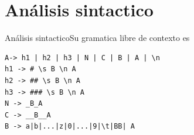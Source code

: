 \documentclass[11pt]{beamer}
\begin{document}
\section{Análisis sintactico}

\begin{frame}[fragile]{Análisis sintactico}{Su gramatica libre de contexto es}
\begin{verbatim}
A-> h1 | h2 | h3 | N | C | B | A | \n
h1 -> # \s B \n A
h2 -> ## \s B \n A
h3 -> ### \s B \n A
N -> _B_A
C -> __B__A
B -> a|b|...|z|0|...|9|\t|BB| A 
\end{verbatim}
\end{frame}
\end{document}
